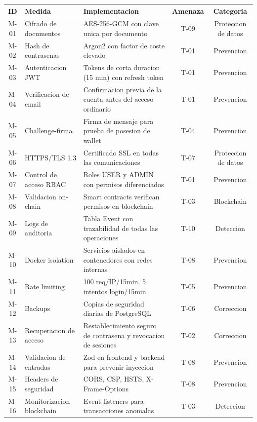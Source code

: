 \documentclass[11pt, a4paper]{article}
\begin{document}
\begin{table}[H]
\centering
\renewcommand{\arraystretch}{1.4}
\small
\begin{tabular}{|c|p{3.5cm}|p{4cm}|c|c|}
\hline
\textbf{ID} & \textbf{Medida} & \textbf{Implementacion} & \textbf{Amenaza} & \textbf{Categoria} \\
\hline
M-01 & Cifrado de documentos & AES-256-GCM con clave unica por documento & T-09 & Proteccion de datos \\
\hline
M-02 & Hash de contrasenas & Argon2 con factor de coste elevado & T-01 & Prevencion \\
\hline
M-03 & Autenticacion JWT & Tokens de corta duracion (15 min) con refresh token & T-01 & Prevencion \\
\hline
M-04 & Verificacion de email & Confirmacion previa de la cuenta antes del acceso ordinario & T-01 & Prevencion \\
\hline
M-05 & Challenge-firma & Firma de mensaje para prueba de posesion de wallet & T-04 & Prevencion \\
\hline
M-06 & HTTPS/TLS 1.3 & Certificado SSL en todas las comunicaciones & T-07 & Proteccion de datos \\
\hline
M-07 & Control de acceso RBAC & Roles USER y ADMIN con permisos diferenciados & T-01 & Prevencion \\
\hline
M-08 & Validacion on-chain & Smart contracts verifican permisos en blockchain & T-03 & Blockchain \\
\hline
M-09 & Logs de auditoria & Tabla Event con trazabilidad de todas las operaciones & T-10 & Deteccion \\
\hline
M-10 & Docker isolation & Servicios aislados en contenedores con redes internas & T-08 & Prevencion \\
\hline
M-11 & Rate limiting & 100 req/IP/15min, 5 intentos login/15min & T-05 & Prevencion \\
\hline
M-12 & Backups & Copias de seguridad diarias de PostgreSQL & T-06 & Correccion \\
\hline
M-13 & Recuperacion de acceso & Restablecimiento seguro de contrasena y revocacion de sesiones & T-02 & Correccion \\
\hline
M-14 & Validacion de entradas & Zod en frontend y backend para prevenir inyeccion & T-08 & Prevencion \\
\hline
M-15 & Headers de seguridad & CORS, CSP, HSTS, X-Frame-Options & T-08 & Prevencion \\
\hline
M-16 & Monitorizacion blockchain & Event listeners para transacciones anomalas & T-03 & Deteccion \\

\end{tabular}
\end{table}
\end{document}
